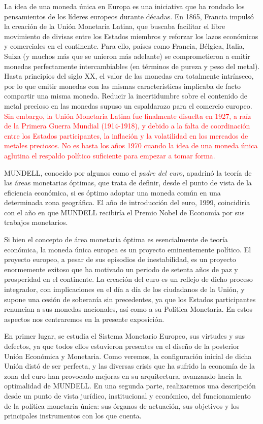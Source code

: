 \documentclass[10pt,a4paper]{article}
\begin{document}
La idea de una moneda única en Europa es una iniciativa que ha rondado los pensamientos de los líderes europeos durante décadas. En 1865, Francia impulsó la creación de la Unión Monetaria Latina, que buscaba facilitar el libre movimiento de divisas entre los Estados miembros y reforzar los lazos económicos y comerciales en el continente. Para ello, países como Francia, Bélgica, Italia, Suiza (y muchos más que se unieron más adelante) se comprometieron a emitir monedas perfectamente intercambiables (en términos de pureza y peso del metal). Hasta principios del siglo XX, el valor de las monedas era totalmente intrínseco, por lo que emitir monedas con las mismas características implicaba de facto compartir una misma moneda. Reducir la incertidumbre sobre el contenido de metal precioso en las monedas supuso un espaldarazo para el comercio europeo. \textcolor{red}{Sin embargo, la Unión Monetaria Latina fue finalmente disuelta en 1927, a raíz de la Primera Guerra Mundial (1914-1918), y debido a la falta de coordinación entre los Estados participantes, la inflación y la volatilidad en los mercados de metales preciosos. No es hasta los años 1970 cuando la idea de una moneda única aglutina el respaldo político suficiente para empezar a tomar forma.} 

MUNDELL, conocido por algunos como el \textit{padre del euro}, apadrinó la teoría de las áreas monetarias óptimas, que trata de definir, desde el punto de vista de la eficiencia económica, si es óptimo adoptar una moneda común en una determinada zona geográfica. El año de introducción del euro, 1999, coincidiría con el año en que MUNDELL recibiría el Premio Nobel de Economía por sus trabajos monetarios. 

Si bien el concepto de área monetaria óptima es esencialmente de teoría económica, la moneda única europea es un proyecto eminentemente político. El proyecto europeo, a pesar de sus episodios de inestabilidad, es un proyecto enormemente exitoso que ha motivado un periodo de setenta años de paz y prosperidad en el continente. La creación del euro es un reflejo de dicho proceso integrador, con implicaciones en el día a día de los ciudadanos de la Unión, y supone una cesión de soberanía sin precedentes, ya que los Estados participantes renuncian a sus monedas nacionales, así como a su Política Monetaria. En estos aspectos nos centraremos en la presente exposición. 

En primer lugar, se estudia el Sistema Monetario Europeo, sus virtudes y sus defectos, ya que todos ellos estuvieron presentes en el diseño de la posterior Unión Económica y Monetaria. Como veremos, la configuración inicial de dicha Unión distó de ser perfecta, y las diversas crisis que ha sufrido la economía de la zona del euro han provocado mejoras en su arquitectura, avanzando hacia la optimalidad de MUNDELL. En una segunda parte, realizaremos una descripción desde un punto de vista jurídico, institucional y económico, del funcionamiento de la política monetaria única: sus órganos de actuación, sus objetivos y los principales instrumentos con los que cuenta.
\end{document}

